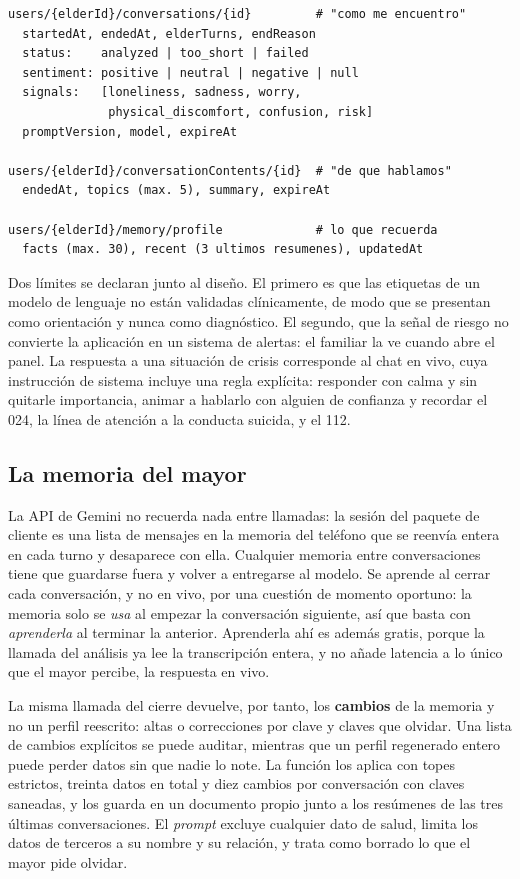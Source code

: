 \begin{lstlisting}[style=Consola, caption={Lo que se guarda de cada conversación en Firestore. La transcripción no aparece en ninguno de los documentos.}, label={lst:modelo-datos}]
users/{elderId}/conversations/{id}         # "como me encuentro"
  startedAt, endedAt, elderTurns, endReason
  status:    analyzed | too_short | failed
  sentiment: positive | neutral | negative | null
  signals:   [loneliness, sadness, worry,
              physical_discomfort, confusion, risk]
  promptVersion, model, expireAt

users/{elderId}/conversationContents/{id}  # "de que hablamos"
  endedAt, topics (max. 5), summary, expireAt

users/{elderId}/memory/profile             # lo que recuerda
  facts (max. 30), recent (3 ultimos resumenes), updatedAt
\end{lstlisting}

Dos límites se declaran junto al diseño. El primero es que las etiquetas de un modelo de lenguaje no están
validadas clínicamente, de modo que se presentan como orientación y nunca como diagnóstico. El segundo, que
la señal de riesgo no convierte la aplicación en un sistema de alertas: el familiar la ve cuando abre el
panel. La respuesta a una situación de crisis corresponde al chat en vivo, cuya instrucción de sistema
incluye una regla explícita: responder con calma y sin quitarle importancia, animar a hablarlo con alguien de
confianza y recordar el 024, la línea de atención a la conducta suicida, y el 112.

\subsection{La memoria del mayor}

La API de Gemini no recuerda nada entre llamadas: la sesión del paquete de cliente es una lista de mensajes
en la memoria del teléfono que se reenvía entera en cada turno y desaparece con ella. Cualquier memoria entre
conversaciones tiene que guardarse fuera y volver a entregarse al modelo. Se aprende al cerrar cada
conversación, y no en vivo, por una cuestión de momento oportuno: la memoria solo se \emph{usa} al empezar
la conversación siguiente, así que basta con \emph{aprenderla} al terminar la anterior. Aprenderla ahí es
además gratis, porque la llamada del análisis ya lee la transcripción entera, y no añade latencia a lo único
que el mayor percibe, la respuesta en vivo.

La misma llamada del cierre devuelve, por tanto, los \textbf{cambios} de la memoria y no un perfil reescrito:
altas o correcciones por clave y claves que olvidar. Una lista de cambios explícitos se puede auditar,
mientras que un perfil regenerado entero puede perder datos sin que nadie lo note. La función los aplica con
topes estrictos, treinta datos en total y diez cambios por conversación con claves saneadas, y los guarda en
un documento propio junto a los resúmenes de las tres últimas conversaciones. El \emph{prompt} excluye
cualquier dato de salud, limita los datos de terceros a su nombre y su relación, y trata como borrado lo que
el mayor pide olvidar.

